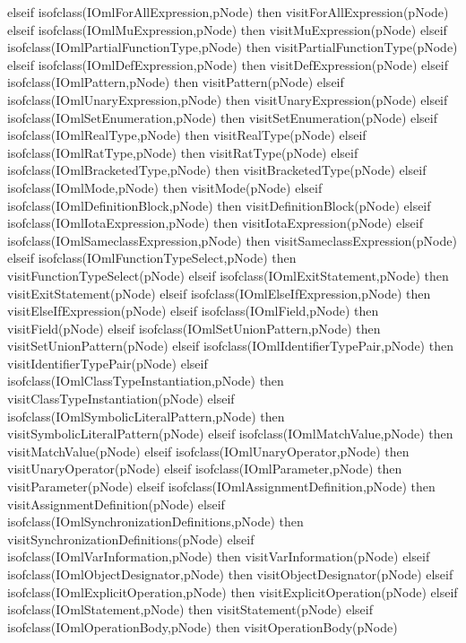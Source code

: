 \begin{vdm_al}
      elseif isofclass(IOmlForAllExpression,pNode) then visitForAllExpression(pNode)
      elseif isofclass(IOmlMuExpression,pNode) then visitMuExpression(pNode)
      elseif isofclass(IOmlPartialFunctionType,pNode) then visitPartialFunctionType(pNode)
      elseif isofclass(IOmlDefExpression,pNode) then visitDefExpression(pNode)
      elseif isofclass(IOmlPattern,pNode) then visitPattern(pNode)
      elseif isofclass(IOmlUnaryExpression,pNode) then visitUnaryExpression(pNode)
      elseif isofclass(IOmlSetEnumeration,pNode) then visitSetEnumeration(pNode)
      elseif isofclass(IOmlRealType,pNode) then visitRealType(pNode)
      elseif isofclass(IOmlRatType,pNode) then visitRatType(pNode)
      elseif isofclass(IOmlBracketedType,pNode) then visitBracketedType(pNode)
      elseif isofclass(IOmlMode,pNode) then visitMode(pNode)
      elseif isofclass(IOmlDefinitionBlock,pNode) then visitDefinitionBlock(pNode)
      elseif isofclass(IOmlIotaExpression,pNode) then visitIotaExpression(pNode)
      elseif isofclass(IOmlSameclassExpression,pNode) then visitSameclassExpression(pNode)
      elseif isofclass(IOmlFunctionTypeSelect,pNode) then visitFunctionTypeSelect(pNode)
      elseif isofclass(IOmlExitStatement,pNode) then visitExitStatement(pNode)
      elseif isofclass(IOmlElseIfExpression,pNode) then visitElseIfExpression(pNode)
      elseif isofclass(IOmlField,pNode) then visitField(pNode)
      elseif isofclass(IOmlSetUnionPattern,pNode) then visitSetUnionPattern(pNode)
      elseif isofclass(IOmlIdentifierTypePair,pNode) then visitIdentifierTypePair(pNode)
      elseif isofclass(IOmlClassTypeInstantiation,pNode) then visitClassTypeInstantiation(pNode)
      elseif isofclass(IOmlSymbolicLiteralPattern,pNode) then visitSymbolicLiteralPattern(pNode)
      elseif isofclass(IOmlMatchValue,pNode) then visitMatchValue(pNode)
      elseif isofclass(IOmlUnaryOperator,pNode) then visitUnaryOperator(pNode)
      elseif isofclass(IOmlParameter,pNode) then visitParameter(pNode)
      elseif isofclass(IOmlAssignmentDefinition,pNode) then visitAssignmentDefinition(pNode)
      elseif isofclass(IOmlSynchronizationDefinitions,pNode) then visitSynchronizationDefinitions(pNode)
      elseif isofclass(IOmlVarInformation,pNode) then visitVarInformation(pNode)
      elseif isofclass(IOmlObjectDesignator,pNode) then visitObjectDesignator(pNode)
      elseif isofclass(IOmlExplicitOperation,pNode) then visitExplicitOperation(pNode)
      elseif isofclass(IOmlStatement,pNode) then visitStatement(pNode)
      elseif isofclass(IOmlOperationBody,pNode) then visitOperationBody(pNode)

\end{vdm_al}

